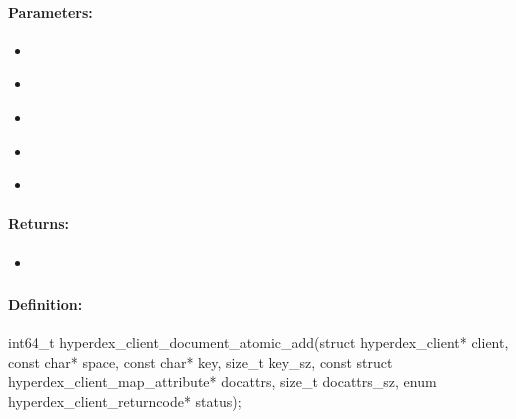 \paragraph{Parameters:}
\begin{itemize}[noitemsep]
\item {}\\

\item {}\\

\item {}\\

\item {}\\

\item {}\\

\end{itemize}

\paragraph{Returns:}
\begin{itemize}[noitemsep]
\item {}\\

\end{itemize}

\pagebreak
\subsubsection{}
\label{api:c:document_atomic_add}


\paragraph{Definition:}
\begin{ccode}
int64_t hyperdex_client_document_atomic_add(struct hyperdex_client* client,
        const char* space,
        const char* key, size_t key_sz,
        const struct hyperdex_client_map_attribute* docattrs, size_t docattrs_sz,
        enum hyperdex_client_returncode* status);
\end{ccode}

